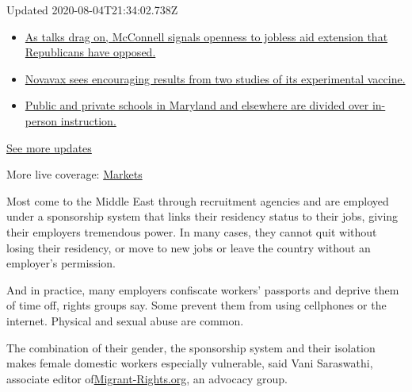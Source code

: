 Updated 2020-08-04T21:34:02.738Z

\begin{itemize}
\tightlist
\item
  \href{https://www.nytimes3xbfgragh.onion/2020/08/04/world/coronavirus-cases.html?action=click\&pgtype=Article\&state=default\&region=MAIN_CONTENT_1\&context=storylines_live_updates\#link-2daa96b5}{As
  talks drag on, McConnell signals openness to jobless aid extension
  that Republicans have opposed.}
\item
  \href{https://www.nytimes3xbfgragh.onion/2020/08/04/world/coronavirus-cases.html?action=click\&pgtype=Article\&state=default\&region=MAIN_CONTENT_1\&context=storylines_live_updates\#link-1228a480}{Novavax
  sees encouraging results from two studies of its experimental
  vaccine.}
\item
  \href{https://www.nytimes3xbfgragh.onion/2020/08/04/world/coronavirus-cases.html?action=click\&pgtype=Article\&state=default\&region=MAIN_CONTENT_1\&context=storylines_live_updates\#link-4825b93}{Public
  and private schools in Maryland and elsewhere are divided over
  in-person instruction.}
\end{itemize}

\href{https://www.nytimes3xbfgragh.onion/2020/08/04/world/coronavirus-cases.html?action=click\&pgtype=Article\&state=default\&region=MAIN_CONTENT_1\&context=storylines_live_updates}{See
more updates}

More live coverage:
\href{https://www.nytimes3xbfgragh.onion/live/2020/08/04/business/stock-market-today-coronavirus?action=click\&pgtype=Article\&state=default\&region=MAIN_CONTENT_1\&context=storylines_live_updates}{Markets}

Most come to the Middle East through recruitment agencies and are
employed under a sponsorship system that links their residency status to
their jobs, giving their employers tremendous power. In many cases, they
cannot quit without losing their residency, or move to new jobs or leave
the country without an employer's permission.

And in practice, many employers confiscate workers' passports and
deprive them of time off, rights groups say. Some prevent them from
using cellphones or the internet. Physical and sexual abuse are common.

The combination of their gender, the sponsorship system and their
isolation makes female domestic workers especially vulnerable, said Vani
Saraswathi, associate editor
of\href{https://www.migrant-rights.org/}{Migrant-Rights.org}, an
advocacy group.

